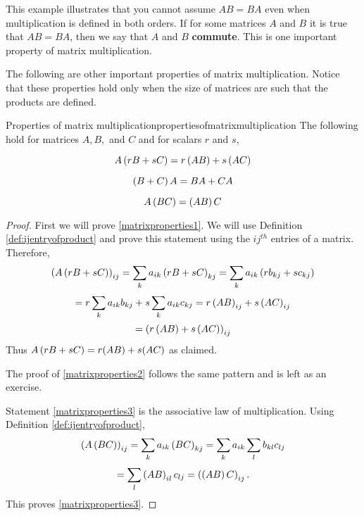 This example illustrates that you cannot assume $AB=BA$ even when
multiplication is defined in both orders. If for some matrices $A$ and
$B$ it is true that $AB=BA$, then we say that $A$ and $B$ \textbf{commute}. This is one 
important property of matrix multiplication.

The following are other important properties of matrix multiplication.
Notice that these properties hold only when the size of matrices are such that the products are defined. 

\begin{proposition}{Properties of matrix multiplication}{propertiesofmatrixmultiplication}
The following hold for matrices $A,B,$ and $C$ and for scalars $r$ and $s$,

\begin{equation}
A\left(rB+sC\right) =r\left(AB\right) +s\left(AC\right)  \label{matrixproperties1}
\end{equation}

\begin{equation}
\left(B+C\right) A=BA+CA  \label{matrixproperties2}
\end{equation}

\begin{equation}
A\left(BC\right) =\left(AB\right) C  \label{matrixproperties3}
\end{equation}
\end{proposition}

\begin{proof}
 First we will prove \ref{matrixproperties1}. We will use Definition \ref{def:ijentryofproduct} 
and prove this statement using the $ij^{th}$ entries of a matrix. 
Therefore, 
\begin{equation*}
\left(A\left(rB+sC\right) \right) _{ij}=\sum_{k}a_{ik}\left(rB+sC\right)
_{kj}=\sum_{k}a_{ik}\left(rb_{kj}+sc_{kj}\right)
\end{equation*}
\begin{equation*}
=r\sum_{k}a_{ik}b_{kj}+s\sum_{k}a_{ik}c_{kj}=r\left(AB\right) _{ij}+s\left(
AC\right) _{ij}
\end{equation*}
\begin{equation*}
=\left(r\left(AB\right) +s\left(AC\right) \right) _{ij}
\end{equation*}
Thus $A\left(rB+sC\right) =r(AB)+s(AC)$ as claimed. 

The proof of \ref{matrixproperties2} follows the same pattern and is left as an exercise. 

Statement \ref{matrixproperties3} is the associative law of multiplication. Using
Definition \ref{def:ijentryofproduct},
\begin{equation*}
\left(A\left(BC\right) \right) _{ij}=\sum_{k}a_{ik}\left(BC\right)
_{kj}=\sum_{k}a_{ik}\sum_{l}b_{kl}c_{lj}
\end{equation*}
\begin{equation*}
=\sum_{l}\left(AB\right) _{il}c_{lj}=\left(\left(AB\right) C\right) _{ij}.
\end{equation*}
This proves \ref{matrixproperties3}.
\end{proof}
